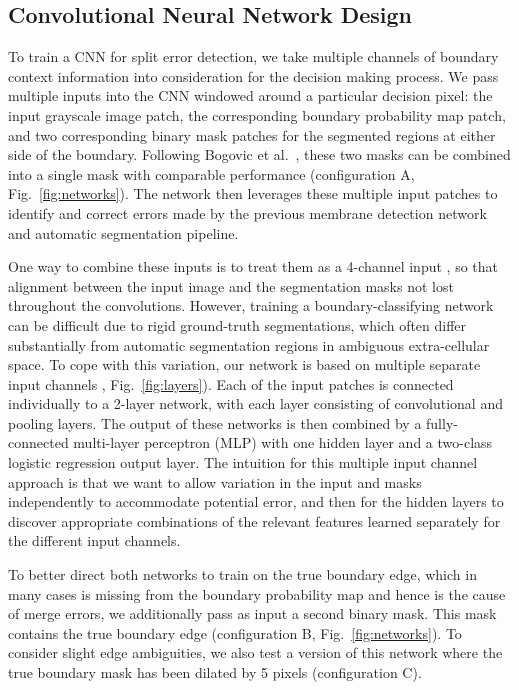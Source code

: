 \subsection{Convolutional Neural Network Design}
To train a CNN for split error detection, we take multiple channels of boundary context information into consideration for the decision making process. We pass multiple inputs into the CNN windowed around a particular decision pixel: the input grayscale image patch, the corresponding boundary probability map patch, and two corresponding binary mask patches for the segmented regions at either side of the boundary. Following Bogovic et al.~\cite{BogovicHJ13}, these two masks can be combined into a single mask with comparable performance (configuration A, Fig.~\ref{fig:networks}). The network then leverages these multiple input patches to identify and correct errors made by the previous membrane detection network and automatic segmentation pipeline.

One way to combine these inputs is to treat them as a 4-channel input , so that alignment between the input image and the segmentation masks  not lost throughout the convolutions. However, training a boundary-classifying network can be difficult due to rigid ground-truth segmentations, which often differ substantially from automatic segmentation regions in ambiguous extra-cellular space. To cope with this variation, our network is based on multiple separate input channels , Fig.~\ref{fig:layers}). Each of the input patches is connected individually to a 2-layer network, with each layer consisting of convolutional and pooling layers. The output of these networks is then combined by a fully-connected multi-layer perceptron (MLP) with one hidden layer and a two-class logistic regression output layer. The intuition for this multiple input channel approach is that we want to allow variation in the input and masks independently to accommodate potential error, and then for the hidden layers to discover appropriate combinations of the relevant features learned separately for the different input channels.

To better direct both networks to train on the true boundary edge, which in many cases is missing from the boundary probability map and hence is the cause of merge errors, we additionally pass as input a second binary mask. This mask contains the true boundary edge (configuration B, Fig.~\ref{fig:networks}). To consider slight edge ambiguities, we also test a version of this network where the true boundary mask has been dilated by 5 pixels (configuration C).



